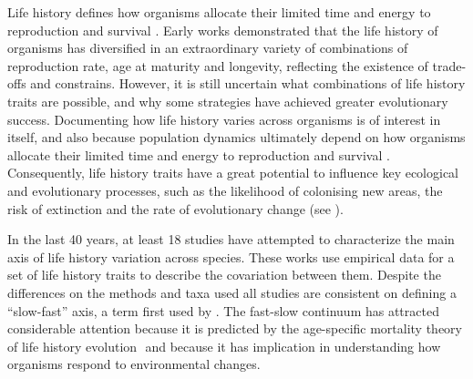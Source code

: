 Life history defines how organisms allocate their limited time and energy to
reproduction and survival \citep{stearns1992evolution}. Early works demonstrated
that the life history of organisms has diversified in an extraordinary variety
of combinations of reproduction rate, age at maturity and longevity, reflecting
the existence of trade-offs and constrains. However, it is  still uncertain
what combinations of life history traits are possible, and why some strategies
have achieved greater evolutionary success. Documenting how life history
varies across organisms is of interest in itself, and also because population
dynamics ultimately depend on how organisms allocate their limited time and
energy to reproduction and survival \citep{stearns1992evolution}. Consequently,
life history traits have a great potential to influence key ecological and
evolutionary processes, such as the likelihood of colonising new areas, the risk
of extinction and the rate of evolutionary change (see
\citet{stearns1992evolution,roff1992evolution,roff2002}).

In the last 40 years, at least 18 studies have attempted to characterize the
main axis of life history variation across species. These works use empirical
data for a set of life history traits to describe the covariation between them.
Despite the differences on the methods and taxa used all studies are consistent
on defining a “slow-fast” axis, a term first used by \citet{Stearns1983a}.
The fast-slow continuum has attracted considerable attention because it is
predicted by the age-specific mortality theory of life history evolution
\citep{Stearns1977,Charlesworth1980}⁠ and because it has implication in
understanding how organisms respond to environmental changes.

